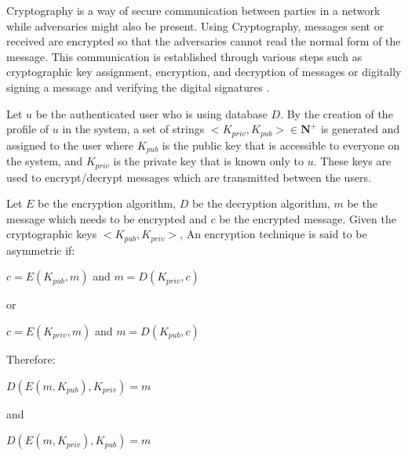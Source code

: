 \begin{defn}[Cryptography]
	Cryptography is a way of secure communication between parties in a network while adversaries might also be present. Using Cryptography, messages sent or received are encrypted so that the adversaries cannot read the normal form of the message. This communication is established through various steps such as cryptographic key assignment, encryption, and decryption of messages or digitally signing a message and verifying the digital signatures \cite{stallings2017cryptography}.
\label{dfn:cryptography}
\end{defn}
\begin{defn}
	Let $u$ be the authenticated user who is using database $D$. By the creation of the profile of $u$ in the system, a set of strings $<K_{priv}, K_{pub}> \in \mathbf{N}^+$ is generated and assigned to the user where $K_{pub}$ is the public key that is accessible to everyone on the system, and $K_{priv}$ is the private key that is known only to $u$. These keys are used to encrypt/decrypt messages which are transmitted between the users\cite{stallings2017cryptography}.
\label{dfn:cryptographic_keys}
\end{defn}
\begin{defn}
	Let $E$ be the encryption algorithm, $D$ be the decryption algorithm, $m$ be the message which needs to be encrypted and $c$ be the encrypted message. Given the cryptographic keys $<K_{pub}, K_{priv}>$, An encryption technique is said to be asymmetric if:
	\begin{center}
		$c = E(K_{pub},m)$ and  $m = D(K_{priv},c)$
	\end{center}
	or
	\begin{center}
		$c = E(K_{priv},m)$ and  $m = D(K_{pub},c)$
	\end{center}
	Therefore:
	\begin{center}
		$D(E(m,K_{pub}),K_{priv}) = m$ 
	\end{center}
	and
	\begin{center}
		$D(E(m,K_{priv}),K_{pub}) = m$
	\end{center}
\label{dfn:assymetric_encryption}
\end{defn}

